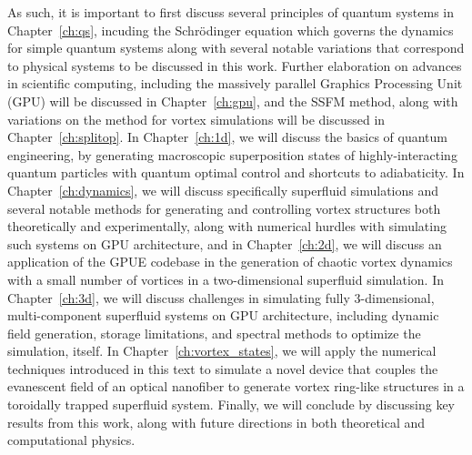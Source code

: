 As such, it is important to first discuss several principles of quantum systems in Chapter~\ref{ch:qs}, incuding the Schr\"odinger equation which governs the dynamics for simple quantum systems along with several notable variations that correspond to physical systems to be discussed in this work.
Further elaboration on advances in scientific computing, including the massively parallel Graphics Processing Unit (GPU) will be discussed in Chapter~\ref{ch:gpu}, and the SSFM method, along with variations on the method for vortex simulations will be discussed in Chapter~\ref{ch:splitop}.
In Chapter~\ref{ch:1d}, we will discuss the basics of quantum engineering, by generating macroscopic superposition states of highly-interacting quantum particles with quantum optimal control and shortcuts to adiabaticity.
In Chapter~\ref{ch:dynamics}, we will discuss specifically superfluid simulations and several notable methods for generating and controlling vortex structures both theoretically and experimentally, along with numerical hurdles with simulating such systems on GPU architecture, and in Chapter~\ref{ch:2d}, we will discuss an application of the GPUE codebase in the generation of chaotic vortex dynamics with a small number of vortices in a two-dimensional superfluid simulation.
In Chapter~\ref{ch:3d}, we will discuss challenges in simulating fully 3-dimensional, multi-component superfluid systems on GPU architecture, including dynamic field generation, storage limitations, and spectral methods to optimize the simulation, itself.
In Chapter~\ref{ch:vortex_states}, we will apply the numerical techniques introduced in this text to simulate a novel device that couples the evanescent field of an optical nanofiber to generate vortex ring-like structures in a toroidally trapped superfluid system.
Finally, we will conclude by discussing key results from this work, along with future directions in both theoretical and computational physics.
